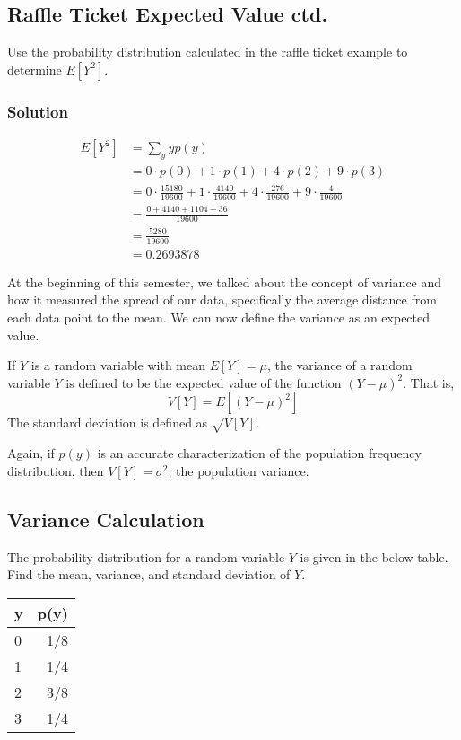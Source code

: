 \documentclass[11pt]{article}
\theoremstyle{definition}
\begin{document}
\subsection{Raffle Ticket Expected Value ctd.}

Use the probability distribution calculated in the raffle ticket example to determine $E[Y^2]$.

\subsubsection*{Solution}

$$
	\begin{aligned}
		E[Y^2] & = \sum_y yp(y) \\
		& = 0 \cdot p(0) + 1 \cdot p(1) + 4 \cdot p(2) + 9 \cdot p(3) \\
		& = 0 \cdot \frac{15180}{19600} + 1 \cdot \frac{4140}{19600} + 4 \cdot \frac{276}{19600} + 9 \cdot \frac{4}{19600} \\
		& = \frac{0 + 4140 + 1104 + 36}{19600} \\
		& = \frac{5280}{19600} \\
		& = 0.2693878
	\end{aligned}
$$

At the beginning of this semester, we talked about the concept of variance and how it measured the spread of our data, specifically the average distance from each data point to the mean. We can now define the variance as an expected value.

\begin{shaded}
	If $Y$ is a random variable with mean $E[Y]=\mu$, the variance of a random variable $Y$ is defined to be the expected value of the function $(Y-\mu)^2$. That is,
	$$
		V[Y] = E[(Y-\mu)^2]
	$$
	The standard deviation is defined as $\sqrt{V[Y]}$.
\end{shaded}

Again, if $p(y)$ is an accurate characterization of the population frequency distribution, then $V[Y]=\sigma^2$, the population variance.

\subsection{Variance Calculation}

The probability distribution for a random variable $Y$ is given in the below table. Find the mean, variance, and standard deviation of $Y$.

\begin{table}[h]
	\centering
	\begin{tabular}{lr}
		\hline
		y & p(y) \\
		\hline
		0 & 1/8 \\
		1 & 1/4 \\
		2 & 3/8 \\
		3 & 1/4 \\
		\hline
	\end{tabular}
\end{table}
\end{document}
